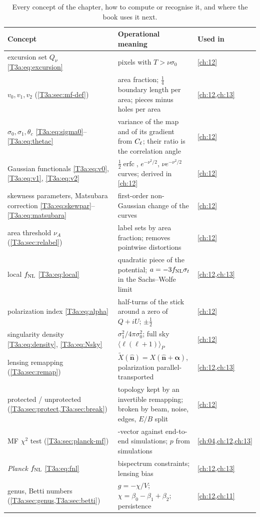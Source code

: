 \begin{table}[htbp]
\centering
\small
\renewcommand{\arraystretch}{1.15}
\begin{tabularx}{\linewidth}{>{\raggedright\arraybackslash}p{3.1cm}>{\raggedright\arraybackslash}X>{\raggedright\arraybackslash}p{2.5cm}}
\toprule
Concept & Operational meaning & Used in\\
\midrule
excursion set $Q_\nu$ \eqref{T3a:eq:excursion} & pixels with $T>\nu\sigma_0$ & \cref{ch:12}\\
$v_0,v_1,v_2$ (\cref{T3a:sec:mf-def}) & area fraction; $\frac14$ boundary length per area; pieces minus holes per area & \cref{ch:12,ch:13}\\
$\sigma_0,\sigma_1,\theta_c$ \eqref{T3a:eq:sigma0}--\eqref{T3a:eq:thetac} & variance of the map and of its gradient from $C_\ell$; their ratio is the correlation angle & \cref{ch:12}\\
Gaussian functionals \eqref{T3a:eq:v0}, \eqref{T3a:eq:v1}, \eqref{T3a:eq:v2} & $\frac12\operatorname{erfc}$, $e^{-\nu^2/2}$, $\nu e^{-\nu^2/2}$ curves; derived in \cref{ch:12} & \cref{ch:12}\\
skewness parameters, Matsubara correction \eqref{T3a:eq:skewpar}--\eqref{T3a:eq:matsubara} & first-order non-Gaussian change of the curves & \cref{ch:12}\\
area threshold $\nu_A$ (\cref{T3a:sec:relabel}) & label sets by area fraction; removes pointwise distortions & \cref{ch:12}\\
local $f_{\rm NL}$ \eqref{T3a:eq:local} & quadratic piece of the potential; $a=-3f_{\rm NL}\sigma_t$ in the Sachs--Wolfe limit & \cref{ch:12,ch:13}\\
polarization index \eqref{T3a:eq:alpha} & half-turns of the stick around a zero of $Q+iU$; $\pm\frac12$ & \cref{ch:12}\\
singularity density \eqref{T3a:eq:density}, \eqref{T3a:eq:Nsky} & $\sigma_1^2/4\pi\sigma_0^2$; full sky $\langle\ell(\ell+1)\rangle_P$ & \cref{ch:12}\\
lensing remapping (\cref{T3a:sec:remap}) & $\tilde X(\hat{\bm n})=X(\hat{\bm n}+\bm\alpha)$, polarization parallel-transported & \cref{ch:12,ch:13}\\
protected / unprotected (\cref{T3a:sec:protect,T3a:sec:break}) & topology kept by an invertible remapping; broken by beam, noise, edges, $E/B$ split & \cref{ch:12}\\
MF $\chi^2$ test (\cref{T3a:sec:planck-mf}) & 36-vector against end-to-end simulations; $p$ from simulations & \cref{ch:04,ch:12,ch:13}\\
\textit{Planck} $f_{\rm NL}$ \eqref{T3a:eq:fnl} & bispectrum constraints; lensing bias & \cref{ch:12,ch:13}\\
genus, Betti numbers (\cref{T3a:sec:genus,T3a:sec:betti}) & $g=-\chi/V$; $\chi=\beta_0-\beta_1+\beta_2$; persistence & \cref{ch:12,ch:11}\\
\bottomrule
\end{tabularx}
\caption{Every concept of the chapter, how to compute or recognise it, and where the book uses it next.}
\label{T3a:tab:summary}
\end{table}

